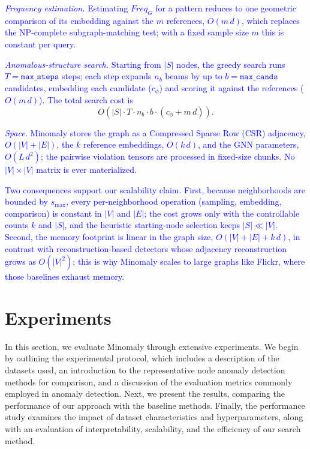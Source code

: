 \documentclass[preprint,12pt]{elsarticle}
\newcommand{\new}[1]{\textcolor{blue}{#1}}
\theoremstyle{plain}
\theoremstyle{definition}
\theoremstyle{remark}
\begin{document}
\new{\emph{Frequency estimation.} Estimating $Freq_G$ for a pattern reduces to one geometric comparison of its embedding against the $m$ references, $O(m\, d)$, which replaces the NP-complete subgraph-matching test; with a fixed sample size $m$ this is constant per query.}

\new{\emph{Anomalous-structure search.} Starting from $|S|$ nodes, the greedy search runs $T=\texttt{max\_steps}$ steps; each step expands $n_b$ beams by up to $b=\texttt{max\_cands}$ candidates, embedding each candidate ($c_{\phi}$) and scoring it against the references ($O(m\, d)$). The total search cost is}
{\color{blue}\[
O\!\left(|S| \cdot T \cdot n_b \cdot b \cdot (c_{\phi} + m\, d)\right).
\]}

\new{\emph{Space.} Minomaly stores the graph as a Compressed Sparse Row (CSR) adjacency, $O(|V|+|E|)$, the $k$ reference embeddings, $O(k\, d)$, and the GNN parameters, $O(L\, d^{2})$; the pairwise violation tensors are processed in fixed-size chunks. No $|V|\times|V|$ matrix is ever materialized.}

\new{Two consequences support our scalability claim. First, because neighborhoods are bounded by $s_{\max}$, every per-neighborhood operation (sampling, embedding, comparison) is constant in $|V|$ and $|E|$; the cost grows only with the controllable counts $k$ and $|S|$, and the heuristic starting-node selection keeps $|S| \ll |V|$. Second, the memory footprint is linear in the graph size, $O(|V|+|E|+k\,d)$, in contrast with reconstruction-based detectors whose adjacency reconstruction grows as $O(|V|^{2})$; this is why Minomaly scales to large graphs like Flickr, where those baselines exhaust memory.}

\section{Experiments}
\label{sec:eval}

In this section, we evaluate Minomaly through extensive experiments. We begin by outlining the experimental protocol, which includes a description of the datasets used, an introduction to the representative node anomaly detection methods for comparison, and a discussion of the evaluation metrics commonly employed in anomaly detection. Next, we present the results, comparing the performance of our approach with the baseline methods. Finally, the performance study examines the impact of dataset characteristics and hyperparameters, along with an evaluation of interpretability, scalability, and the efficiency of our search method.
\end{document}
